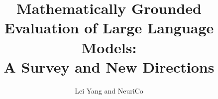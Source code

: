 \documentclass{article}
\title{Mathematically Grounded Evaluation of Large Language Models:\\A Survey and New Directions}
\author{Lei Yang and NeuriCo}
\begin{document}
\maketitle

\begin{abstract}

\end{abstract}










\end{document}

